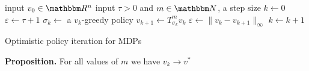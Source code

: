 \documentclass[xcolor=dvipsnames]{beamer}
\newcommand{\RR}{\mathbbm R}
\newcommand{\NN}{\mathbbm N}
\renewcommand{\epsilon}{\varepsilon}
\newcommand{\1}{\mathbbm 1}
\begin{document}
\begin{frame}
    
    {\small
    \begin{algorithm}[H]
        \DontPrintSemicolon
        input $v_0 \in \RR^n$\;
        \vspace{0.3em}
        input $\tau > 0$ and $m \in \NN$, a step size \;
        \vspace{0.3em}
        $k \leftarrow 0$ \;
        \vspace{0.3em}
        $\epsilon \leftarrow \tau + 1$ \;
        \vspace{0.3em}
        \While{$\epsilon > \tau $}
        {
            $\sigma_k \leftarrow $ a $v_k$-greedy policy \;
        \vspace{0.3em}
            $v_{k+1} \leftarrow T_{\sigma_k}^m v_k$  \;
        \vspace{0.3em}
            $\epsilon \leftarrow \| v_k - v_{k+1} \|_\infty$ \;
        \vspace{0.3em}
            $k \leftarrow k + 1$ \;
        }
        \vspace{0.3em}
        \caption{Optimistic policy iteration for MDPs}
    \end{algorithm}
    }

\end{frame}


\begin{frame}

    \vspace{0.5em}
    \vspace{0.5em}
    \begin{block}{}
        {\bf Proposition.} For all values of $m$ we have $v_k \to v^*$
    \end{block}


\end{frame}
\end{document}
